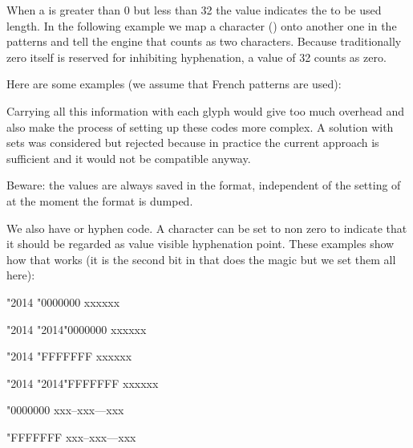 When a \type {\hjcode} is greater than 0 but less than 32 the value indicates the
to be used length. In the following example we map a character () onto
another one in the patterns and tell the engine that  counts as two
characters. Because traditionally zero itself is reserved for inhibiting
hyphenation, a value of 32 counts as zero.

Here are some examples (we assume that French patterns are used):

\starttabulate[||||]
\NC                                  \NC {} \NC {} \NC \NR
\NC {}              \NC {} \NC {} \NC \NR
\NC {}           \NC {} \NC {} \NC \NR
\NC {}           \NC {} \NC {}  \NC \NR
\NC {}               \NC {} \NC {} \NC \NR
\NC {} \NC {} \NC {}  \NC \NR
\NC
\stoptabulate

Carrying all this information with each glyph would give too much overhead and
also make the process of setting up these codes more complex. A solution with
\type {\hjcode} sets was considered but rejected because in practice the current
approach is sufficient and it would not be compatible anyway.

Beware: the values are always saved in the format, independent of the setting
of \type {\savinghyphcodes} at the moment the format is dumped.

We also have \type {\hccode} or hyphen code. A character can be set to non zero
to indicate that it should be regarded as value visible hyphenation point. These
examples show how that works (it is the second bit in \type {\hyphenationmode}
that does the magic but we set them all here):

\startbuffer
{\hsize 1mm \hccode"2014 \zerocount  \hyphenationmode "0000000 xxx\emdash xxx \par}
{\hsize 1mm \hccode"2014 "2014\relax \hyphenationmode "0000000 xxx\emdash xxx \par}

{\hsize 1mm \hccode"2014 \zerocount  \hyphenationmode "FFFFFFF xxx\emdash xxx \par}
{\hsize 1mm \hccode"2014 "2014\relax \hyphenationmode "FFFFFFF xxx\emdash xxx \par}

{\hyphenationmode "0000000 xxx--xxx---xxx \par}
{\hyphenationmode "FFFFFFF xxx--xxx---xxx \par}
\stopbuffer

